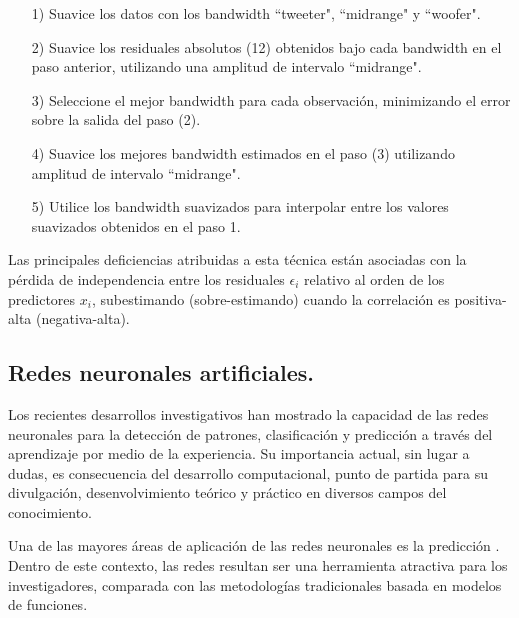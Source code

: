 \begin{itemize}
  \item[1)] Suavice los datos con los bandwidth ``tweeter"\hspace*{0.01 cm}, ``midrange"\hspace*{0.01 cm} y ``woofer"\hspace*{0.01 cm}.
  \item[2)] Suavice los residuales absolutos (12) obtenidos bajo cada bandwidth en el paso anterior, utilizando una amplitud de intervalo ``midrange"\hspace*{0.01 cm}.
  \item[3)] Seleccione el mejor bandwidth para cada observaci\'on, minimizando el error sobre la salida del paso (2).
  \item[4)] Suavice los mejores bandwidth estimados en el paso (3) utilizando amplitud de intervalo ``midrange"\hspace*{0.01 cm}.
  \item[5)] Utilice los bandwidth suavizados para interpolar entre los valores suavizados obtenidos en el paso 1.
\end{itemize}


\hspace*{0.4 cm} Las principales deficiencias atribuidas a esta t\'ecnica est\'an asociadas con la p\'erdida de independencia entre los residuales $\epsilon_{i}$ relativo al orden de los predictores $x_{i}$, subestimando (sobre-estimando) cuando la correlaci\'on es positiva-alta (negativa-alta).

\subsection{Redes neuronales artificiales.\\}


\hspace*{0.4 cm} Los recientes desarrollos investigativos han mostrado la capacidad de las redes neuronales para la detecci\'on de patrones, clasificaci\'on y predicci\'on a trav\'es del aprendizaje por medio de la experiencia. Su importancia actual, sin lugar a dudas, es consecuencia del desarrollo computacional, punto de partida para su divulgaci\'on, desenvolvimiento te\'orico y pr\'actico en diversos campos del conocimiento.

\hspace*{0.4 cm} Una de las mayores \'areas de aplicaci\'on de las redes neuronales es la predicci\'on \cite{SH}. Dentro de este contexto, las redes resultan ser una herramienta atractiva para los investigadores, comparada con las metodolog\'ias tradicionales basada en modelos de funciones.

